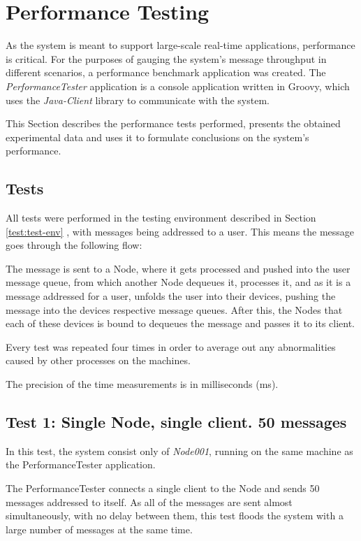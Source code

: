 \section{Performance Testing}
As the system is meant to support large-scale real-time applications, performance is critical. For the purposes of gauging the system's message throughput in different scenarios, a performance benchmark application was created. The \textit{PerformanceTester} application is a console application written in Groovy, which uses the \textit{Java-Client} library to communicate with the system.

This Section describes the performance tests performed, presents the obtained experimental data and uses it to formulate conclusions on the system's performance.

\subsection{Tests}
All tests were performed in the testing environment described in Section \ref{test:test-env} , with messages being addressed to a user. This means the message goes through the following flow:

The message is sent to a Node, where it gets processed and pushed into the user message queue, from which another Node dequeues it, processes it, and as it is a message addressed for a user, unfolds the user into their devices, pushing the message into the devices respective message queues. After this, the Nodes that each of these devices is bound to dequeues the message and passes it to its client.

Every test was repeated four times in order to average out any abnormalities caused by other processes on the machines.

The precision of the time measurements is in milliseconds (ms).

\subsection{Test 1: Single Node, single client. 50 messages}
In this test, the system consist only of \textit{Node001}, running on the same machine as the PerformanceTester application. 

The PerformanceTester connects a single client to the Node and sends 50 messages addressed to itself. As all of the messages are sent almost simultaneously, with no delay between them, this test floods the system with a large number of messages at the same time.

